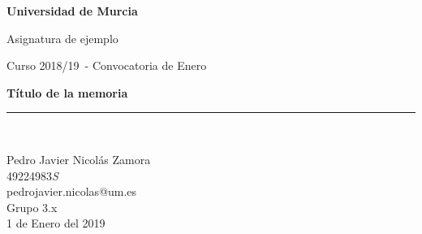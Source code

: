 \documentclass[a4paper,spanish,12pt]{report}
\title{\textitle}
\author{Pedro Javier Nicol\'as Zamora}
\newcommand{\textitle}{Título de la memoria}
\newcommand{\texsubject}{Asignatura de ejemplo}
\newcommand{\texyear}{2018/19}
\newcommand{\texmonth}{Enero}
\newcommand{\texdate}{1 de Enero del 2019}
\newcommand{\texgroup}{Grupo 3.x}
\begin{document}

\begin{titlepage}
\begin{center}
\begin{figure}[htb]
\end{figure}
\begin{Huge}
\textbf{Universidad de Murcia}\\
\end{Huge}
\begin{huge}
\vspace{0.1cm}
\texsubject \\
\end{huge}
\begin{LARGE}
Curso \texyear\ - Convocatoria de \texmonth \\
\end{LARGE}
\vspace*{2cm}
\begin{Huge}
\textbf{\textitle} \\
\end{Huge}
\vspace*{10cm}
\rule{80mm}{0.1mm}\\
\vspace*{0.5cm}
\begin{Large}

Pedro Javier Nicolás Zamora\\
49224983\textit{S}\ \ \ \ \\
pedrojavier.nicolas@um.es\\

\vspace*{0.5cm}
\texgroup \\
\texdate \\
\end{Large}
\end{center}
\end{titlepage}

\setcounter{page}{2}

\tableofcontents
\pagebreak


\end{document}
